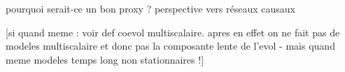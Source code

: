 

pourquoi serait-ce un bon proxy ? perspective vers réseaux causaux
\cite{seth2005causal}
\cite{castellacci2013dynamics}


[si quand meme : voir def coevol multiscalaire. apres en effet on ne fait pas de modeles multiscalaire et donc pas la composante lente de l'evol - mais quand meme modeles temps long non stationnaires !]






